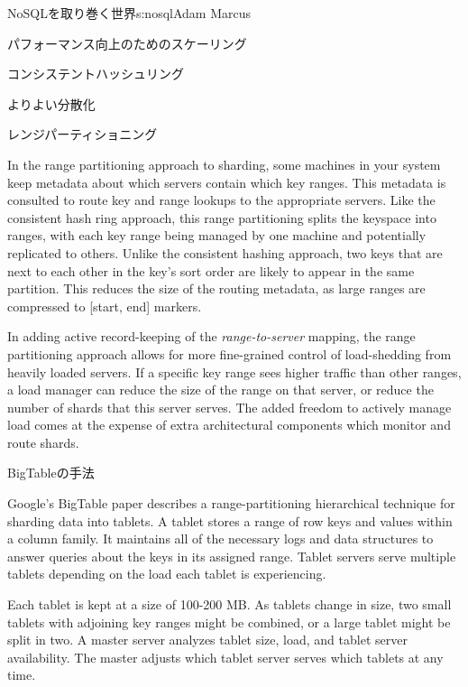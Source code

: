 \begin{aosachapter}{NoSQLを取り巻く世界}{s:nosql}{Adam Marcus}
\begin{aosasect1}{パフォーマンス向上のためのスケーリング}
\begin{aosasect2}{コンシステントハッシュリング}
\begin{aosasect3}{よりよい分散化}
\end{aosasect3}

\end{aosasect2}

\vspace{-0.2cm} %
\begin{aosasect2}{レンジパーティショニング}
\vspace{-0.1cm} %

In the range partitioning approach to sharding, some machines in your
system keep metadata about which servers contain which key ranges.
This metadata is consulted to route key and range lookups to the
appropriate servers.  Like the consistent hash ring approach, this
range partitioning splits the keyspace into ranges, with each key
range being managed by one machine and potentially replicated to
others.  Unlike the consistent hashing approach, two keys that are
next to each other in the key's sort order are likely to appear in the
same partition.  This reduces the size of the routing metadata, as
large ranges are compressed to [start, end] markers.

In adding active record-keeping of the \emph{range-to-server} mapping,
the range partitioning approach allows for more fine-grained control
of load-shedding from heavily loaded servers.  If a specific key range
sees higher traffic than other ranges, a load manager can reduce the
size of the range on that server, or reduce the number of shards that
this server serves.  The added freedom to actively manage load comes
at the expense of extra architectural components which monitor and
route shards.

\vspace{-0.1cm} %
\begin{aosasect3}{BigTableの手法}

Google's BigTable paper describes a range-partitioning hierarchical
technique for sharding data into tablets.  A tablet stores a range of
row keys and values within a column family.  It maintains all
of the necessary logs and data structures to answer queries about the
keys in its assigned range.  Tablet servers serve multiple tablets
depending on the load each tablet is experiencing.

Each tablet is kept at a size of 100-200 MB\@.  As tablets change in size, two 
small tablets with adjoining key ranges might be combined, or a large tablet might be
split in two.  A master server analyzes tablet size,
load, and tablet server availability.  The master adjusts which tablet
server serves which tablets at any time.


\end{aosasect3}
\end{aosasect2}
\end{aosasect1}
\end{aosachapter}
